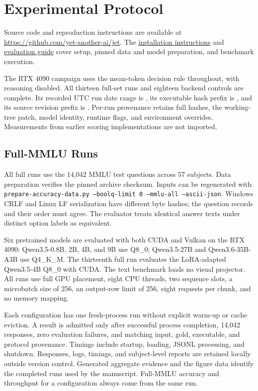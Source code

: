 \section{Experimental Protocol}
\label{sec:reproducibility}
Source code and reproduction instructions are available at
\url{https://github.com/yet-another-ai/jet}.
The \href{https://github.com/yet-another-ai/jet#build}{installation instructions}
and \href{https://github.com/yet-another-ai/jet/blob/main/tests/accuracy/README.md}{evaluation guide}
cover setup, pinned data and model preparation, and benchmark execution.

The RTX 4090 campaign uses the mean-token decision rule throughout, with
reasoning disabled. All thirteen full-set runs and eighteen backend controls
are complete. Its recorded UTC run date range is ,
its executable hash prefix is \texttt{}, and its
source revision prefix is \texttt{}.
Per-run provenance retains full hashes, the working-tree patch, model identity,
runtime flags, and environment overrides. Measurements from earlier scoring
implementations are not imported.

\subsection{Full-MMLU Runs}
All full runs use the 14,042 MMLU test questions across 57 subjects. Data
preparation verifies the pinned archive checksum. Inputs can be regenerated
with \texttt{prepare-accuracy-data.py --boolq-limit 0 --mmlu-all --ascii-json}.
Windows CRLF and Linux LF serialization have different byte hashes; the
question records and their order must agree. The evaluator treats identical
answer texts under distinct option labels as equivalent.

Six pretrained models are evaluated with both CUDA and Vulkan on the RTX 4090:
Qwen3.5-0.8B, 2B, 4B, and 9B use Q8\_0; Qwen3.5-27B and
Qwen3.6-35B-A3B use Q4\_K\_M. The thirteenth full run evaluates the
LoRA-adapted Qwen3.5-4B Q8\_0 with CUDA. The text benchmark loads no visual
projector. All runs use full GPU placement, eight CPU threads, two sequence
slots, a microbatch size of 256, an output-row limit of 256, eight requests per
chunk, and no memory mapping.

Each configuration has one fresh-process run without explicit warm-up or cache
eviction. A result is admitted only after successful process completion,
14,042 responses, zero evaluation failures, and matching input, gold, executable,
and protocol provenance. Timings include startup, loading, JSONL processing,
and shutdown. Responses, logs, timings, and subject-level reports are retained
locally outside version control. Generated aggregate evidence and the figure
data identify the completed runs used by the manuscript. Full-MMLU accuracy
and throughput for a configuration always come from the same run.

